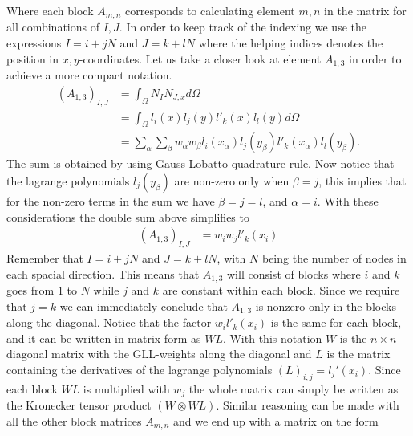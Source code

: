 Where each block $A_{m,n}$ corresponds to  calculating element $m,n$ in the matrix for all combinations of $I,J$. In order to keep track of the indexing we use the expressions $I = i+jN$ and $J = k+lN$ where the helping indices denotes the position in $x,y$-coordinates. Let us take a closer look at element $A_{1,3}$ in order to achieve a more compact notation. 
\begin{align}
	(A_{1,3})_{I,J} &= \int_{\Omega} N_I N_{J,x} d\Omega \\
	&= \int_{\Omega} l_i(x)l_j(y)l'_k(x)l_l(y) d\Omega \\
	&= \sum_{\alpha}\sum_{\beta} w_{\alpha}w_{\beta}l_i(x_{\alpha})l_j(y_{\beta})l'_k(x_{\alpha})l_l(y_{\beta}).
	\label{eq:MatrixDerivation}
\end{align}
The sum is obtained by using Gauss Lobatto quadrature rule. Now notice that the lagrange polynomials $l_j(y_{\beta})$ are non-zero only when $\beta = j$, this implies that for the non-zero terms in the sum we have $\beta = j=l$, and $\alpha = i$. With these considerations the double sum above simplifies to  
\begin{align}
	(A_{1,3})_{I,J} &= w_{i}w_{j}l'_k(x_{i})
	\label{eq:MatrixDerivation2}
\end{align}
Remember that $I = i+jN$ and $J = k+lN$, with $N$ being the number of nodes in each spacial direction. This means that $A_{1,3}$ will consist of blocks where $i$ and $k$ goes from $1$ to $N$ while $j$ and $k$ are constant within each block. Since we require that $j=k$ we can immediately conclude that $A_{1,3}$ is nonzero only in the blocks along the diagonal. Notice that the factor $w_il'_k(x_i)$ is the same for each block, and it can be written in matrix form as $WL$. With this notation $W$ is the $n \times n$ diagonal matrix with the GLL-weights along the diagonal and $L$ is the matrix containing the derivatives of the lagrange polynomials $(L)_{i,j}= l_j'(x_i)$. Since each block $WL$ is multiplied with $w_j$ the whole matrix can simply be written as the Kronecker tensor product $(W\otimes WL)$. Similar reasoning can be made with all the other block matrices $A_{m,n}$ and we end up with a matrix on the form


